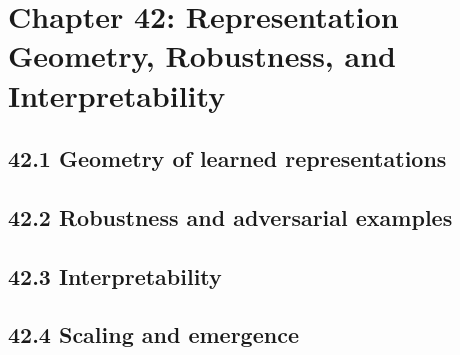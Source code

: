 \section{Chapter 42: Representation Geometry, Robustness, and Interpretability}

\subsection{42.1 Geometry of learned representations}

\subsection{42.2 Robustness and adversarial examples}

\subsection{42.3 Interpretability}

\subsection{42.4 Scaling and emergence}

\clearpage
